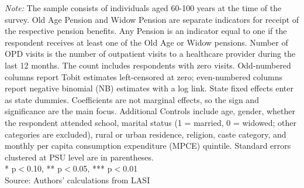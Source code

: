 \begin{table}[H]
\centering
\vspace{1.8mm}
\caption{Number of OPD Visits and Pension: Tobit and Negative Binomial Estimates}
\label{tab:opd_tobit_nb}
\vspace{3mm}
\vspace{2mm}
\begin{minipage}{0.95\textwidth}
\footnotesize \textit{Note:} The sample consists of individuals aged 60-100 years at the time of the survey. Old Age Pension and Widow Pension are separate indicators for receipt of the respective pension benefits. Any Pension is an indicator equal to one if the respondent receives at least one of the Old Age or Widow pensions. Number of OPD visits is the number of outpatient visits to a healthcare provider during the last 12 months. The count includes respondents with zero visits. Odd-numbered columns report Tobit estimates left-censored at zero; even-numbered columns report negative binomial (NB) estimates with a log link. State fixed effects enter as state dummies. Coefficients are not marginal effects, so the sign and significance are the main focus. Additional Controls include age, gender, whether the respondent attended school, marital status (1 = married, 0 = widowed; other categories are excluded), rural or urban residence, religion, caste category, and monthly per capita consumption expenditure (MPCE) quintile. Standard errors clustered at PSU level are in parentheses. \\ * p$<$0.10, ** p$<$0.05, *** p$<$0.01\\
Source: Authors' calculations from LASI
\end{minipage}
\end{table}
